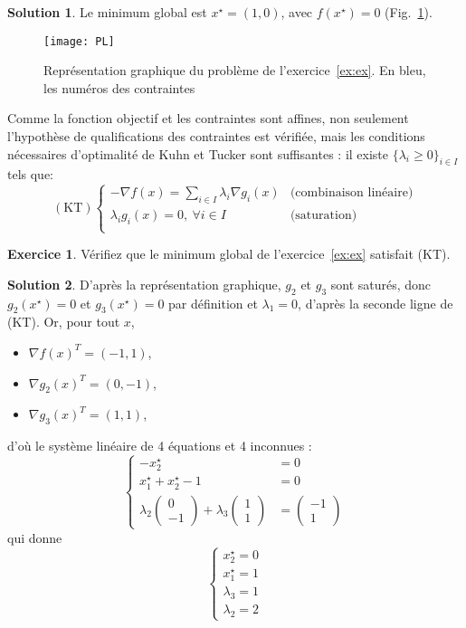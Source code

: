 \documentclass[a4paper,francais]{article}
\theoremstyle{definition}
\newtheorem{exercice}{Exercice}[section]
\newtheorem*{solution}{Solution}
\begin{document}
\begin{solution}
Le minimum global est $x^\star = (1,0)$, avec $f(x^\star) = 0$ (Fig.~\ref{fig:exPL}).  
\begin{figure}
  \centering
  \texttt{[image: PL]}
  \caption{Représentation graphique du problème de l'exercice~\ref{ex:ex}.
    En bleu, les numéros des contraintes}
  \label{fig:exPL}
\end{figure}
\end{solution}

Comme la fonction objectif et les contraintes sont affines, non seulement
l'hypothèse de qualifications des contraintes est vérifiée, mais les conditions
nécessaires d'optimalité de Kuhn et Tucker sont suffisantes : 
il existe $\{\lambda_i \geq 0\}_{i \in I}$ tels que:
\[
(\text{KT})
\left\{
\begin{array}{ll}
  -{\nabla f}(x) = \sum_{i \in I} \lambda_i {\nabla g_i}(x) & \text{(combinaison linéaire)}\\
  \lambda_i g_i(x) = 0, \ \forall i \in I  & \text{(saturation)}\\
\end{array}
\right.
\]

\begin{exercice}
Vérifiez que le minimum global de l'exercice~\ref{ex:ex} satisfait (KT). 
\end{exercice}

\begin{solution}
  D'après la représentation graphique, $g_2$ et $g_3$ sont saturés, donc
  $g_2(x^\star) = 0$ et $g_3(x^\star) = 0$ par définition et $\lambda_1 = 0$,
  d'après la seconde ligne de (KT). Or, pour tout $x$,
  \begin{itemize}
  \item ${{\nabla f}(x)}^T = (-1,1)$,
  \item ${{\nabla g_2}(x)}^T = (0,-1)$,
  \item ${{\nabla g_3}(x)}^T = (1,1)$,
  \end{itemize}
  d'où le système linéaire de 4 équations et 4 inconnues : 
\[
\left\{
\begin{array}{ll}
  - x^\star_2 &= 0 \\
  x^\star_1 + x^\star_2 - 1 &= 0 \\
  \lambda_2 \left(\begin{array}{c} 0 \\ -1 \end{array}\right)
  + \lambda_3 \left(\begin{array}{c} 1 \\ 1 \end{array}\right)
  &= \left(\begin{array}{c} -1 \\ 1 \end{array}\right)
\end{array}
\right.
\]
qui donne
\[
\left\{
\begin{array}{l}
  x^\star_2 = 0 \\
  x^\star_1 = 1 \\
  \lambda_3 = 1 \\
  \lambda_2 = 2 
\end{array}
\right.
\]
\end{solution}
\end{document}
